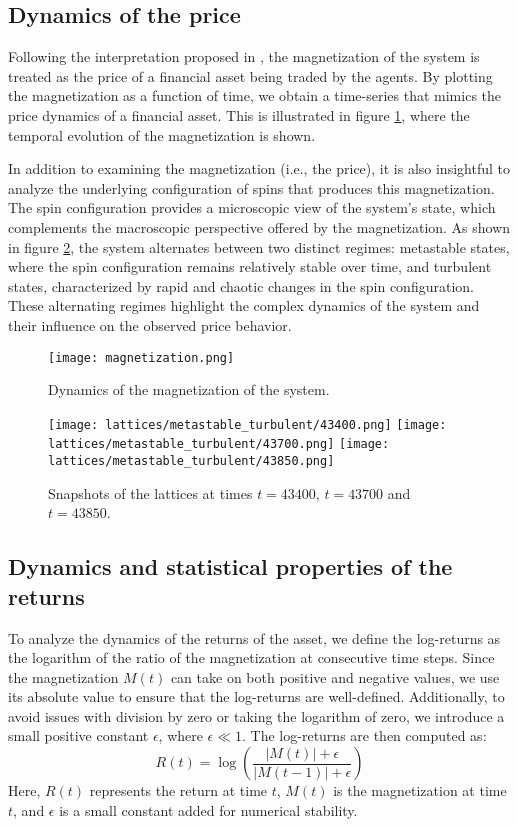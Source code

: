 \subsection{Dynamics of the price}
Following the interpretation proposed in \cite{bornholdt}, the magnetization of the system is treated as the price of a financial asset being traded by the agents. By plotting the magnetization as a function of time, we obtain a time-series that mimics the price dynamics of a financial asset. This is illustrated in figure \ref{fig:magnetization}, where the temporal evolution of the magnetization is shown.

In addition to examining the magnetization (i.e., the price), it is also insightful to analyze the underlying configuration of spins that produces this magnetization. The spin configuration provides a microscopic view of the system's state, which complements the macroscopic perspective offered by the magnetization. As shown in figure \ref{fig:lattices}, the system alternates between two distinct regimes: metastable states, where the spin configuration remains relatively stable over time, and turbulent states, characterized by rapid and chaotic changes in the spin configuration. These alternating regimes highlight the complex dynamics of the system and their influence on the observed price behavior.

\begin{figure}[H]
    \centering
    \texttt{[image: magnetization.png]}
    \caption{Dynamics of the magnetization of the system.}
    \label{fig:magnetization}
\end{figure}

\begin{figure}[H]
    \centering
    \texttt{[image: lattices/metastable\_turbulent/43400.png]}
    \texttt{[image: lattices/metastable\_turbulent/43700.png]}
    \texttt{[image: lattices/metastable\_turbulent/43850.png]}
    \caption{Snapshots of the lattices at times $t=43400$, $t=43700$ and $t=43850$.}
    \label{fig:lattices}
\end{figure}

\subsection{Dynamics and statistical properties of the returns}
To analyze the dynamics of the returns of the asset, we define the log-returns as the logarithm of the ratio of the magnetization at consecutive time steps. Since the magnetization $M(t)$ can take on both positive and negative values, we use its absolute value to ensure that the log-returns are well-defined. Additionally, to avoid issues with division by zero or taking the logarithm of zero, we introduce a small positive constant $\epsilon$, where $\epsilon \ll 1$. The log-returns are then computed as:
\begin{equation}
    R(t) = \log\left(\frac{|M(t)| + \epsilon}{|M(t-1)| + \epsilon}\right)
\end{equation}
Here, $R(t)$ represents the return at time $t$, $M(t)$ is the magnetization at time $t$, and $\epsilon$ is a small constant added for numerical stability.


